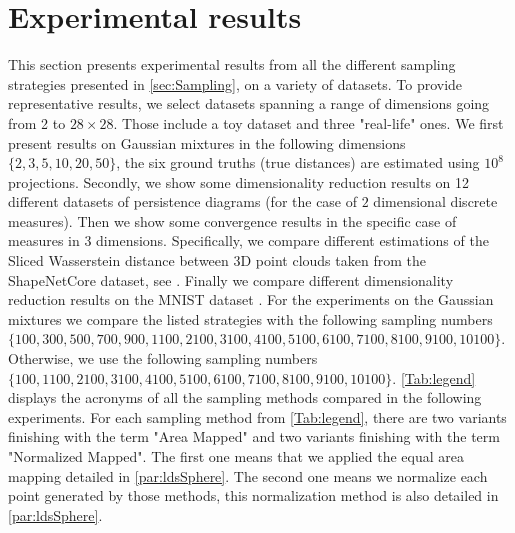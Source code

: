 \section{Experimental results} \label{sec:Exp}

This section presents experimental results from all the different 
sampling strategies 
{presented in }
\autoref{sec:Sampling}, on 
{a variety of}
datasets. {To provide representative results, we select
datasets spanning a range of dimensions going from 2 to $28\times 28$. Those 
include a toy dataset and three "real-life" ones.}
We first present results on Gaussian mixtures in the following dimensions 
$\lbrace 2, 3, 5, 10, 20, 50\rbrace$, the six ground truths (true distances) are 
estimated using 
{$10^8$}
projections.
{Secondly, we show some 
{dimensionality}
reduction results on 12 different datasets of persistence diagrams 
{(}for the case of $2$ dimensional discrete measures{)}. Then we 
show some convergence results in the specific case of measures in $3$ 
{dimensions.}
{Specifically, }
we compare different 
{estimations}
of 
{the}
Sliced Wasserstein distance 
between $3$D point 
{clouds}
taken from the ShapeNetCore dataset, see 
\citep{chang2015shapenetinformationrich3dmodel}. Finally we compare
different 
{dimensionality}
reduction results on the MNIST dataset 
\citep{lecun1998mnist}.} For the experiments on the Gaussian mixtures we compare 
the listed strategies with the following sampling numbers $\lbrace 100, 300, 
500, 700, 900, 1100, 2100, 3100, 4100, 5100, 6100, 7100, 8100, 9100, 
10100\rbrace$. Otherwise, we use the following sampling numbers $\{100, 1100, 
2100, 3100, 4100, 5100, 6100, 7100, 8100, 9100, 10100\}${.} 
{\autoref{Tab:legend} displays the acronyms of all the sampling methods 
compared in the following experiments.} 
{{For each sampling method from}
\autoref{Tab:legend}, there are two {variants} finishing 
{with the 
term} "Area Mapped" and two {variants} finishing 
{with the term}
"Normalized Mapped". 
The first one means that we applied the equal area mapping detailed in 
\autoref{par:ldsSphere}. The second one means we normalize each point generated 
by those methods, this normalization method is also detailed in 
\autoref{par:ldsSphere}.}


